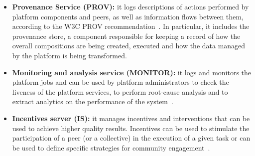 \begin{itemize}
\item \textbf{Provenance Service (PROV):} it logs descriptions of actions performed by platform
components and peers, as well as information flows between them, according to the W3C PROV recommendation~\cite{D2.2}. In particular, it includes the provenance store, a component responsible for keeping a record of how the overall compositions are being created, executed and how the data managed by the platform is being transformed. %

\item {\bf Monitoring and analysis service (MONITOR):} it logs and monitors the platform jobs and can be used by platform administrators to check the liveness of the platform services, to perform root-cause analysis and to extract analytics on the performance of the system~\cite{D8.3}. 

\item {\bf Incentives server (IS):} it manages incentives and
interventions that can be used to achieve higher quality results. Incentives %
can be used to stimulate the participation of a peer (or a collective) in the execution of a given task 
or can be used to define specific strategies for community engagement~\cite{D5.4}. %
\end{itemize} 	



